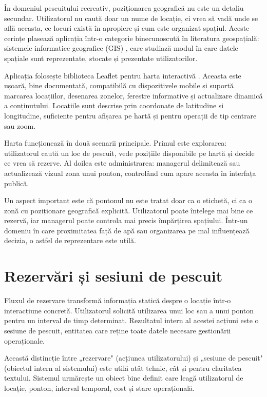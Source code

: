 În domeniul pescuitului recreativ, poziționarea geografică nu este un detaliu secundar. Utilizatorul nu caută doar un nume de locație, ci vrea să vadă unde se află aceasta, ce locuri există în apropiere și cum este organizat spațiul. Aceste cerințe plasează aplicația într-o categorie binecunoscută în literatura geospațială: sistemele informatice geografice (GIS) \citep{worboys2004gis,longley2015gis}, care studiază modul în care datele spațiale sunt reprezentate, stocate și prezentate utilizatorilor.

Aplicația folosește biblioteca Leaflet pentru harta interactivă \citep{leaflet}. Aceasta este ușoară, bine documentată, compatibilă cu dispozitivele mobile și suportă marcarea locațiilor, desenarea zonelor, ferestre informative și actualizare dinamică a conținutului. Locațiile sunt descrise prin coordonate de latitudine și longitudine, suficiente pentru afișarea pe hartă și pentru operații de tip centrare sau zoom.

Harta funcționează în două scenarii principale. Primul este explorarea: utilizatorul caută un loc de pescuit, vede pozițiile disponibile pe hartă și decide ce vrea să rezerve. Al doilea este administrarea: managerul delimitează sau actualizează vizual zona unui ponton, controlând cum apare aceasta în interfața publică.

Un aspect important este că pontonul nu este tratat doar ca o etichetă, ci ca o zonă cu poziționare geografică explicită. Utilizatorul poate înțelege mai bine ce rezervă, iar managerul poate controla mai precis împărțirea spațiului. Într-un domeniu în care proximitatea față de apă sau organizarea pe mal influențează decizia, o astfel de reprezentare este utilă.

\section{Rezervări și sesiuni de pescuit}

Fluxul de rezervare transformă informația statică despre o locație într-o interacțiune concretă. Utilizatorul solicită utilizarea unui loc sau a unui ponton pentru un interval de timp determinat. Rezultatul intern al acestei acțiuni este o sesiune de pescuit, entitatea care reține toate datele necesare gestionării operaționale.

Această distincție între „rezervare" (acțiunea utilizatorului) și „sesiune de pescuit" (obiectul intern al sistemului) este utilă atât tehnic, cât și pentru claritatea textului. Sistemul urmărește un obiect bine definit care leagă utilizatorul de locație, ponton, interval temporal, cost și stare operațională.

